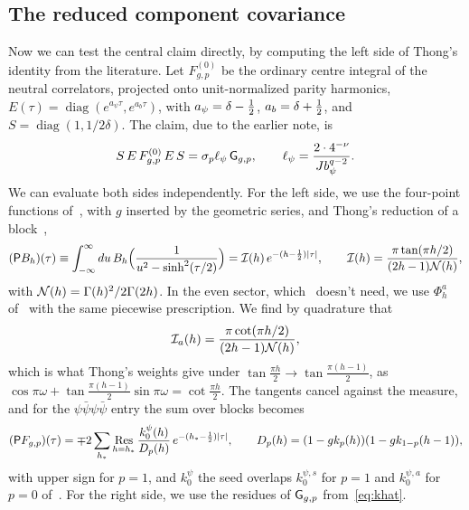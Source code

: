 \subsection{The reduced component covariance}
\label{subsec:reduced-cov}

Now we can test the central claim directly, by computing the left side of Thong's identity from the literature. Let $F^{(0)}_{g,p}$ be the ordinary centre integral of the neutral correlators, projected onto unit-normalized parity harmonics, $E(\tau)=\operatorname{diag}(e^{a_\psi\tau},e^{a_b\tau})$, with $a_\psi=\delta-\tfrac12$, $a_b=\delta+\tfrac12$, and $S=\operatorname{diag}(1,1/2\delta)$. The claim, due to the earlier note, is
\begin{equation}\label{eq:cov-norm}
S\,E\,F^{(0)}_{g,p}\,E\,S=\sigma_p\ell_\psi\,\mathsf{G}_{g,p},\qquad\ell_\psi=\frac{2\cdot4^{-\nu}}{Jb_\psi^{q-2}}.
\end{equation}
We can evaluate both sides independently. For the left side, we use the four-point functions of~\cite[(4.26), (4.35)]{Peng:2017spg}, with $g$ inserted by the geometric series, and Thong's reduction of a block~\cite[(C.8)]{Thong:2026},
\begin{equation}\label{eq:P}
(\mathsf PB_h)(\tau)\equiv\int_{-\infty}^\infty du\,B_h\Big(\frac{1}{u^2-\sinh^2(\tau/2)}\Big)=\mathcal{I}(h)\,e^{-(h-\frac12)|\tau|},\qquad\mathcal{I}(h)=\frac{\pi\tan(\pi h/2)}{(2h-1)\mathcal{N}(h)},
\end{equation}
with $\mathcal{N}(h)=\Gamma(h)^2/2\Gamma(2h)$. In the even sector, which~\cite{Thong:2026} doesn't need, we use $\Phi^a_h$ of~\cite{Peng:2017spg} with the same piecewise prescription. We find by quadrature that
\begin{equation}\label{eq:Ia}
\mathcal{I}_a(h)=\frac{\pi\cot(\pi h/2)}{(2h-1)\mathcal{N}(h)},
\end{equation}
which is what Thong's weights give under $\tan\frac{\pi h}{2}\to\tan\frac{\pi(h-1)}{2}$, as $\cos\pi\omega+\tan\frac{\pi(h-1)}{2}\sin\pi\omega=\cot\frac{\pi h}2$. The tangents cancel against the measure, and for the $\psi\bar\psi\psi\bar\psi$ entry the sum over blocks becomes
\begin{equation}\label{eq:PF}
(\mathsf PF_{g,p})(\tau)=\mp2\sum_{h_*}\operatorname*{Res}_{h=h_*}\frac{k_0^{\psi}(h)}{D_p(h)}\,e^{-(h_*-\frac12)|\tau|},\qquad D_p(h)=(1-gk_p(h))(1-gk_{1-p}(h-1)),
\end{equation}
with upper sign for $p=1$, and $k_0^\psi$ the seed overlaps $k_0^{\psi,s}$ for $p=1$ and $k_0^{\psi,a}$ for $p=0$ of~\cite[(4.10), (4.11)]{Peng:2017spg}. For the right side, we use the residues of $\mathsf{G}_{g,p}$ from~\eqref{eq:khat}.

